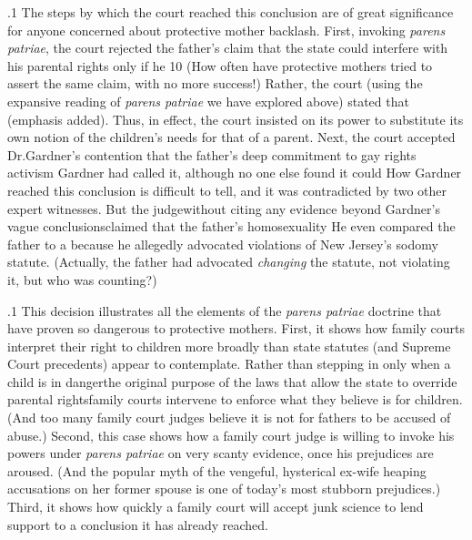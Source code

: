 \documentclass[11pt, twoside]{article}
\begin{document}
{\p.1{%
The steps by which the court reached this conclusion are of great significance for anyone concerned about protective mother backlash. First,
invoking \textit{parens patriae}, the court rejected the father’s claim that the
state could interfere with his parental rights only if he  10 (How often have
protective mothers tried to assert the same claim, with no more success!) Rather, the court (using the expansive reading of \textit{parens patriae}
we have explored above) stated that  (emphasis added). Thus, in effect, the court insisted on
its power to substitute its own notion of the children’s needs for that of
a parent. Next, the court accepted Dr.\@ Gardner’s contention that the father’s
deep commitment to gay rights activism\mdash{}
Gardner had called it, although no one else found it \mdash{}could
 How Gardner
reached this conclusion is difficult to tell, and it was contradicted by
two other expert witnesses. But the judge\mdash{}without citing any evidence
beyond Gardner’s vague conclusions\mdash{}claimed that the father’s homosexuality  He even compared the father to
a  because he allegedly advocated violations of New Jersey’s sodomy statute. (Actually, the father had advocated \textit{changing} the
statute, not violating it, but who was counting?)
}%

\p.1{%
This decision illustrates all the elements of the \textit{parens patriae} doctrine that have proven so dangerous to protective mothers. First, it
shows how family courts interpret their right to  children more
broadly than state statutes (and Supreme Court precedents) appear to
contemplate. Rather than stepping in only when a child is
in danger\mdash{}the original purpose of the laws that allow the state to override parental
rights\mdash{}family courts intervene to enforce what they believe is 
for children. (And too many family court judges believe it is not 
for fathers to be accused of abuse.) Second, this case shows how a family court judge is willing to invoke his powers under \textit{parens patriae} on
very scanty evidence, once his prejudices are aroused. (And the popular
myth of the vengeful, hysterical ex-wife heaping accusations on her former spouse is one of today’s most stubborn prejudices.) Third, it shows
how quickly a family court will accept junk science to lend support to a
conclusion it has already reached.
}%

}
\end{document}
